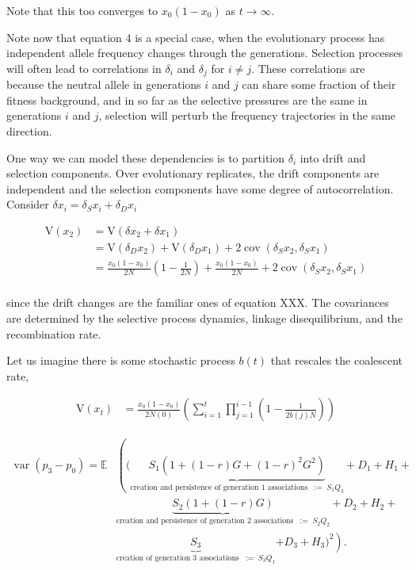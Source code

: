 \documentclass[11pt]{article}
\newcommand{\E}{\mathbb{E}}
\newcommand{\V}{\text{V}}
\DeclareMathOperator{\var}{var}
\DeclareMathOperator{\cov}{cov}
\begin{document}
Note that this too converges to $x_0(1-x_0)$ as $t \to \infty$.

Note now that equation 4 is a special case, when the evolutionary process has
independent allele frequency changes through the generations. Selection
processes will often lead to correlations in $\delta_i$ and $\delta_j$ for $i
\ne j$. These correlations are because the neutral allele in generations $i$
and $j$ can share some fraction of their fitness background, and in so far as
the selective pressures are the same in generations $i$ and $j$, selection will
perturb the frequency trajectories in the same direction. 

One way we can model these dependencies is to partition $\delta_i$ into drift
and selection components. Over evolutionary replicates, the drift components
are independent and the selection components have some degree of
autocorrelation. Consider $\delta x_i = \delta_S x_i + \delta_D x_i$



\begin{align}
  \V(x_2) &= \V\left(\delta x_2 + \delta x_1\right) \\
          &= \V(\delta_D x_2) + \V(\delta_D x_1) + 2 \cov(\delta_S x_2, \delta_S x_1) \\
          &= \frac{x_0(1-x_0)}{2N}\left(1 - \frac{1}{2N}\right) + \frac{x_0(1-x_0)}{2N} +  2 \cov(\delta_S x_2, \delta_S x_1) \\
\end{align}

since the drift changes are the familiar ones of equation XXX. The covariances
are determined by the selective process dynamics, linkage disequilibrium, and
the recombination rate.



Let us imagine there is some stochastic process $b(t)$ that rescales the coalescent
rate, 

\begin{align}
  \V(x_t) &= \frac{x_0(1-x_0)}{2N(0)}\left(\sum_{i=1}^t \prod_{j=1}^{i-1} \left(1 - \frac{1}{2b(j)N}\right) \right)
\end{align}



\begin{align}
  \var(p_3 - p_0) = \E & \left( \bigg( \underbrace{S_1(1 + (1-r) G + (1-r)^2 G^2)}_{\text{creation and persistence of generation 1 associations} \;\; := \; S_1 Q_3} \right. +  D_1 + H_1+ \nonumber \\
                       & \underbrace{S_2(1 + (1-r) G)}_{\text{creation and persistence of generation 2 associations} \;\; := \; S_2 Q_2}+ D_2 + H_2 + \nonumber \\
                       &  \underbrace{S_3}_{\text{creation of generation 3 associations} \;\; := \; S_3 Q_1  }\left. + D_3 + H_3 \bigg)^2 \right). &
    \label{eq:scr-var2}
\end{align}
%
\end{document}
